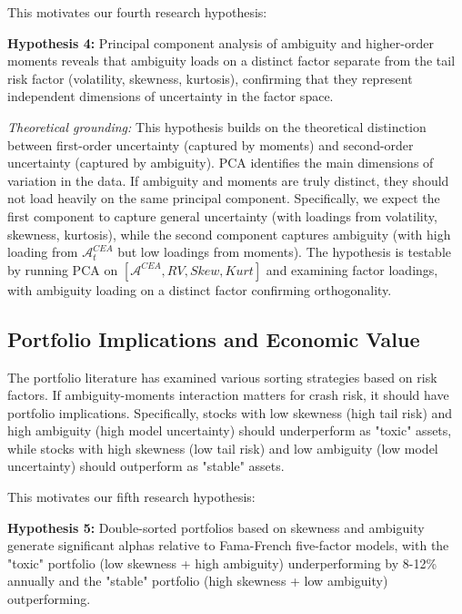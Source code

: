 \documentclass[preprint,12pt,authoryear]{elsarticle}
\begin{document}
This motivates our fourth research hypothesis:

\begin{center}
\textbf{Hypothesis 4:} Principal component analysis of ambiguity and higher-order moments reveals that ambiguity loads on a distinct factor separate from the tail risk factor (volatility, skewness, kurtosis), confirming that they represent independent dimensions of uncertainty in the factor space.
\end{center}

\noindent
\textit{Theoretical grounding:} This hypothesis builds on the theoretical distinction between first-order uncertainty (captured by moments) and second-order uncertainty (captured by ambiguity). PCA identifies the main dimensions of variation in the data. If ambiguity and moments are truly distinct, they should not load heavily on the same principal component. Specifically, we expect the first component to capture general uncertainty (with loadings from volatility, skewness, kurtosis), while the second component captures ambiguity (with high loading from $\mathcal{A}^{CEA}_t$ but low loadings from moments). The hypothesis is testable by running PCA on $[\mathcal{A}^{CEA}, RV, Skew, Kurt]$ and examining factor loadings, with ambiguity loading on a distinct factor confirming orthogonality.

\subsection{Portfolio Implications and Economic Value}

The portfolio literature has examined various sorting strategies based on risk factors. If ambiguity-moments interaction matters for crash risk, it should have portfolio implications. Specifically, stocks with low skewness (high tail risk) and high ambiguity (high model uncertainty) should underperform as "toxic" assets, while stocks with high skewness (low tail risk) and low ambiguity (low model uncertainty) should outperform as "stable" assets.

This motivates our fifth research hypothesis:

\begin{center}
\textbf{Hypothesis 5:} Double-sorted portfolios based on skewness and ambiguity generate significant alphas relative to Fama-French five-factor models, with the "toxic" portfolio (low skewness + high ambiguity) underperforming by 8-12\% annually and the "stable" portfolio (high skewness + low ambiguity) outperforming.
\end{center}
\end{document}
